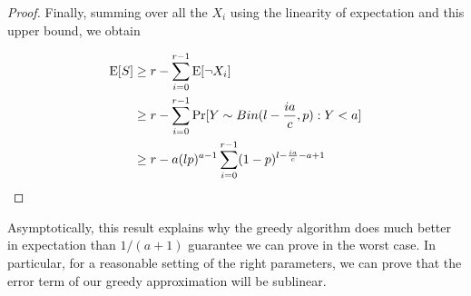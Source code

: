 \begin{proof}
Finally, summing over all the $X_i$ using the linearity of
expectation and this upper bound, we obtain

\begin{align*}
      \text{E}[S]
&\geq r - \sum_{i=0}^{r-1} \text{E}[\lnot X_i] \\
&\geq r - \sum_{i=0}^{r-1} \Pr[Y \sim Bin(l-\frac{ia}{c},p): Y < a] \\
&\geq r - a(lp)^{a-1}\sum_{i=0}^{r-1}(1-p)^{l-\frac{ia}{c}-a+1}
\end{align*}
\end{proof}

Asymptotically, this result explains why the greedy
algorithm does much better in expectation than $1/(a+1)$ guarantee we
can prove in the worst case. In particular, for a reasonable setting of
the right parameters, we can prove that the error term of our greedy
approximation will be sublinear.

